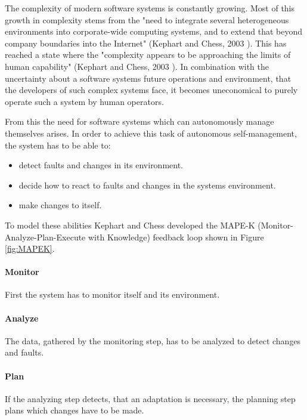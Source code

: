 The complexity of modern software systems is constantly growing.
Most of this growth in complexity stems from the
"need to integrate several heterogeneous environments into corporate-wide computing systems, 
and to extend that beyond company boundaries into the Internet" (Kephart and Chess, 2003 \cite*{VisionOfAutonomicComputing}).
This has reached a state where the 
"complexity appears to be approaching the limits of human capability" (Kephart and Chess, 2003 \cite*{VisionOfAutonomicComputing}).
In combination with the uncertainty about a software systems future operations and environment,
that the developers of such complex systems face, it becomes uneconomical to purely operate such a system by human operators.
\newline
\par


From this the need for software systems which can autonomously manage themselves arises.
In order to achieve this task of autonomous self-management, the system has to be able to:
\begin{itemize}
    \item detect faults and changes in its environment.
    \item decide how to react to faults and changes in the systems environment.
    \item make changes to itself.
\end{itemize}

To model these abilities Kephart and Chess developed
the MAPE-K (Monitor-Analyze-Plan-Execute with Knowledge) feedback loop \cite*{VisionOfAutonomicComputing} shown in Figure \ref{fig:MAPEK}.
\paragraph*{Monitor} First the system has to monitor itself and its environment. 
\paragraph*{Analyze} The data, gathered by the monitoring step, has to be analyzed to detect changes and faults.
\paragraph*{Plan} If the analyzing step detects, that an adaptation is necessary, 
the planning step plans which changes have to be made.

